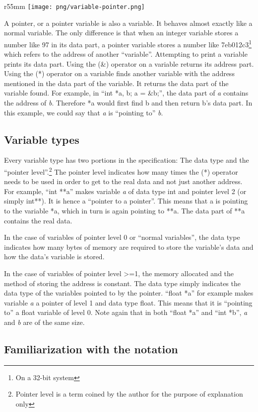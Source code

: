 \documentclass[10pt,twoside]{article}
\begin{document}
\begin{wrapfigure}{r}{55mm}
\texttt{[image: png/variable-pointer.png]}
\end{wrapfigure}

A pointer, or a pointer variable is also a variable. It behaves almost exactly
like a normal variable. The only difference is that when an integer variable
stores a number like 97 in its data part, a pointer variable stores a number
like 7eb012c3\footnote{On a 32-bit system} which refers to the address of
another ``variable''. Attempting to print a variable prints its data part. Using
the (\&) operator on a variable returns its address part. Using the (*) operator
on a variable finds another variable with the address mentioned in the data part
of the variable.  It returns the data part of the variable found. For example,
in ``int *a, b; a = \&b;'', the data part of \textit{a} contains the address of
\textit{b}. Therefore *a would first find b and then return b's data part. In
this example, we could say that \textit{a} is ``pointing to'' \textit{b}.
\subsection*{Variable types} Every variable type has two portions in the
specification: The data type and the ``pointer level''.\footnote{Pointer level
is a term coined by the author for the purpose of explanation only} The pointer
level indicates how many times the (*) operator needs to be used in order to get
to the real data and not just another address. For example, ``int **a'' makes
variable \textit{a} of data type int and pointer level 2 (or simply int**). It
is hence a ``pointer to a pointer''. This means that a is pointing to the
variable *a, which in turn is again pointing to **a. The data part of **a
contains the real data.

In the case of variables of pointer level 0 or ``normal variables'', the data
type indicates how many bytes of memory are required to store the variable's
data and how the data's variable is stored.

In the case of variables of pointer level {\textgreater}=1, the memory allocated
and the method of storing the address is constant. The data type simply
indicates the data type of the variables pointed to by the pointer. ``float *a''
for example makes variable \textit{a }\textup{a pointer of level 1 and data type
float. This means that it is ``pointing to'' a float variable of level 0. Note
again that in both ``float *a'' and ``int *b'', }\textit{a}\textup{ and
}\textit{b }\textup{are of the same size.} \newpage \subsection*{Familiarization
with the notation}
\end{document}
